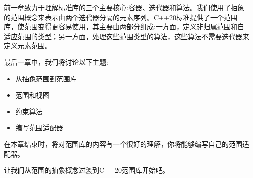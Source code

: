 前一章致力于理解标准库的三个主要核心:容器、迭代器和算法。我们使用了抽象的范围概念来表示由两个迭代器分隔的元素序列。C++20标准提供了一个范围库，使范围变得更容易使用，其主要由两部分组成:一方面，定义非归属范围和自适应范围的类型；另一方面，处理这些范围类型的算法，这些算法不需要迭代器来定义元素范围。

最后一章中，我们将讨论以下主题:

\begin{itemize}
\item
从抽象范围到范围库

\item
范围和视图

\item
约束算法

\item
编写范围适配器
\end{itemize}

在本章结束时，将对范围库的内容有一个很好的理解，你将能够编写自己的范围适配器。

让我们从范围的抽象概念过渡到C++20范围库开始吧。


















